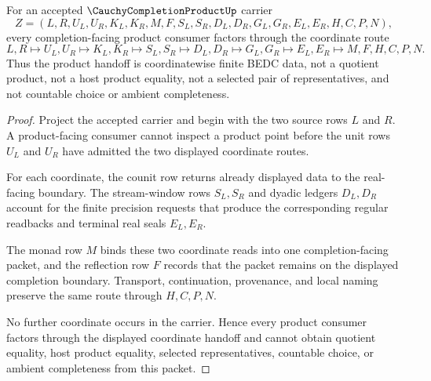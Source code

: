 \begin{theorem}
\label{thm:cauchy-completion-product-coordinate-handoff}
For an accepted $\CauchyCompletionProductUp$ carrier
$$
Z=(L,R,U_L,U_R,K_L,K_R,M,F,S_L,S_R,D_L,D_R,G_L,G_R,E_L,E_R,H,C,P,N),
$$
every completion-facing product consumer factors through the coordinate route
$$
L,R\longmapsto U_L,U_R\longmapsto K_L,K_R\longmapsto S_L,S_R\longmapsto D_L,D_R\longmapsto G_L,G_R\longmapsto E_L,E_R\longmapsto M,F,H,C,P,N .
$$
Thus the product handoff is coordinatewise finite BEDC data, not a quotient product, not a host product equality, not a selected pair of representatives, and not countable choice or ambient completeness.
\end{theorem}
\begin{proof}
Project the accepted carrier and begin with the two source rows $L$ and $R$. A product-facing consumer cannot inspect a product point before the unit rows $U_L$ and $U_R$ have admitted the two displayed coordinate routes.

For each coordinate, the counit row returns already displayed data to the real-facing boundary. The stream-window rows $S_L,S_R$ and dyadic ledgers $D_L,D_R$ account for the finite precision requests that produce the corresponding regular readbacks and terminal real seals $E_L,E_R$.

The monad row $M$ binds these two coordinate reads into one completion-facing packet, and the reflection row $F$ records that the packet remains on the displayed completion boundary. Transport, continuation, provenance, and local naming preserve the same route through $H,C,P,N$.

No further coordinate occurs in the carrier. Hence every product consumer factors through the displayed coordinate handoff and cannot obtain quotient equality, host product equality, selected representatives, countable choice, or ambient completeness from this packet.
\end{proof}

